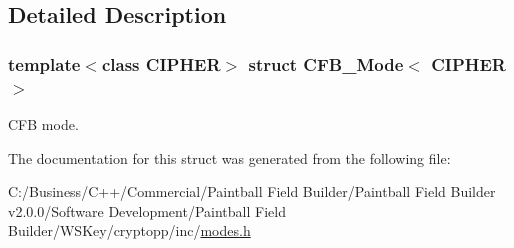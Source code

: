 \subsection{Detailed Description}
\subsubsection*{template$<$class CIPHER$>$ struct CFB\_\-Mode$<$ CIPHER $>$}

CFB mode. 

The documentation for this struct was generated from the following file:\begin{DoxyCompactItemize}
\item 
C:/Business/C++/Commercial/Paintball Field Builder/Paintball Field Builder v2.0.0/Software Development/Paintball Field Builder/WSKey/cryptopp/inc/\hyperlink{modes_8h}{modes.h}\end{DoxyCompactItemize}
